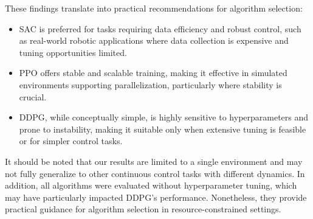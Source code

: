 \noindent These findings translate into practical recommendations for algorithm selection:

\begin{itemize}
    \item \gls{SAC} is preferred for tasks requiring data efficiency and robust control, such as real-world robotic applications where data collection is expensive and tuning opportunities limited.
    \item \gls{PPO} offers stable and scalable training, making it effective in simulated environments supporting parallelization, particularly where stability is crucial.
    \item \gls{DDPG}, while conceptually simple, is highly sensitive to hyperparameters and prone to instability, making it suitable only when extensive tuning is feasible or for simpler control tasks.
\end{itemize}

\noindent It should be noted that our results are limited to a single environment and may not fully generalize to other continuous control tasks with different dynamics. In addition, all algorithms were evaluated without hyperparameter tuning, which may have particularly impacted \gls{DDPG}'s performance. Nonetheless, they provide practical guidance for algorithm selection in resource-constrained settings.



